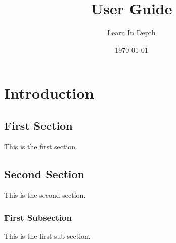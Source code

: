\documentclass[12pt, letterpaper]{article}
\title{User Guide}
\author{Learn In Depth}
\date{\today}
\begin{document}
\chapter{Introduction}

\section{First Section}

This is the first section.

\section{Second Section}

This is the second section.

\subsection{First Subsection}

This is the first sub-section.
\end{document}
